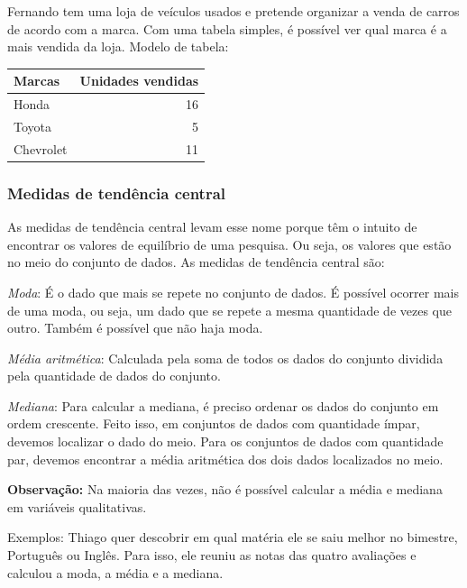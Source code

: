 {Fernando tem uma loja de veículos usados e pretende
organizar a venda de carros de acordo com a marca. Com uma tabela
simples, é possível ver qual marca é a mais vendida da loja. Modelo de
tabela:

{\medskip    \hfill
  \begin{tabular}{lr}
    \toprule
    Marcas & Unidades vendidas \\
    \midrule
    Honda & 16 \\
    Toyota & 5 \\
    Chevrolet & 11 \\
    \bottomrule
  \end{tabular}\hfill
}


\subsubsection{Medidas de tendência central}

As medidas de tendência central levam esse nome porque têm o intuito de
encontrar os valores de equilíbrio de uma pesquisa. Ou seja, os valores
que estão no meio do conjunto de dados. As medidas de tendência central
são:

\medskip \noindent \textit{Moda}: É o dado que mais se repete no conjunto de dados. É possível
ocorrer mais de uma moda, ou seja, um dado que se repete a mesma
quantidade de vezes que outro. Também é possível que não haja moda.

\medskip \noindent \textit{Média aritmética}: Calculada pela soma de todos os dados do conjunto
dividida pela quantidade de dados do conjunto.

\medskip \noindent \textit{Mediana}: Para calcular a mediana, é preciso ordenar os dados do conjunto
em ordem crescente. Feito isso, em conjuntos de dados com quantidade
ímpar, devemos localizar o dado do meio. Para os conjuntos de dados com
quantidade par, devemos encontrar a média aritmética dos dois dados
localizados no meio.

\medskip  \noindent \textbf{Observação:} Na maioria das vezes, não é possível calcular a média e mediana em
variáveis qualitativas.

Exemplos: Thiago quer descobrir em qual matéria ele se saiu melhor no
bimestre, Português ou Inglês. Para isso, ele reuniu as notas das quatro
avaliações e calculou a moda, a média e a mediana.



}
